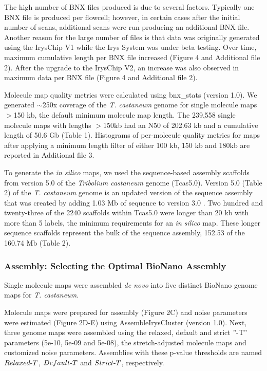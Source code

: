 \documentclass{bmcart}
\begin{document}
The high number of BNX files produced is due to several factors. Typically one BNX file is produced per flowcell; however, in certain cases after the initial number of scans, additional scans were run producing an additional BNX file. Another reason for the large number of files is that data was originally generated using the IrysChip\textregistered\textnormal{ }V1 while the Irys System was under beta testing. Over time, maximum cumulative length per BNX file increased (Figure 4 and Additional file 2). After the upgrade to the IrysChip V2, an increase was also observed in maximum data per BNX file (Figure 4 and Additional file 2).

Molecule map quality metrics were calculated using bnx\_stats (version 1.0). We generated $\sim$250x coverage of the \textit{T. castaneum} genome for single molecule maps $>$150 kb, the default minimum molecule map length. The 239,558 single molecule maps with lengths $>$150kb had an N50 of 202.63 kb and a cumulative length of 50.6 Gb (Table 1). Histograms of per-molecule quality metrics for maps after applying a minimum length filter of either 100 kb, 150 kb and 180kb are reported in Additional file 3. 

To generate the \textit{in silico} maps, we used the sequence-based assembly scaffolds from version 5.0 of the \textit{Tribolium castaneum} genome (Tcas5.0). Version 5.0 (Table 2) of the \textit{T. castaneum} genome is an updated version of the sequence assembly that was created by adding 1.03 Mb of sequence to version 3.0 \cite{Beetle2008}. Two hundred and twenty-three of the 2240 scaffolds within Tcas5.0 were longer than 20 kb with more than 5 labels, the minimum requirements for an \textit{in silico}  map. These longer sequence scaffolds represent the bulk of the sequence assembly, 152.53 of the 160.74 Mb (Table 2).


\subsubsection*{Assembly: Selecting the Optimal BioNano Assembly}
Single molecule maps were assembled \textit{de novo} into five distinct BioNano genome maps for \textit{T. castaneum}. 

Molecule maps were prepared for assembly (Figure 2C) and noise parameters were estimated (Figure 2D-E) using AssembleIrysCluster (version 1.0). Next, three genome maps were assembled using the relaxed, default and strict ”-T” parameters (5e-10, 5e-09 and 5e-08), the stretch-adjusted molecule maps and customized noise parameters. Assemblies with these p-value thresholds are named $Relaxed\textnormal{-}T$, $Default\textnormal{-}T$ and $Strict\textnormal{-}T$, respectively. 
\end{document}

